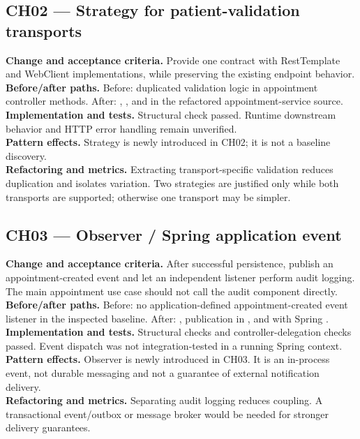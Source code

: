 \documentclass[11pt,a4paper]{article}
\begin{document}
\subsection{CH02 — Strategy for patient-validation transports}
\textbf{Change and acceptance criteria.} Provide one  contract with RestTemplate and WebClient implementations, while preserving the existing endpoint behavior.\\
\textbf{Before/after paths.} Before: duplicated validation logic in appointment controller methods. After: , , and  in the refactored appointment-service source.\\
\textbf{Implementation and tests.} Structural check  passed. Runtime downstream behavior and HTTP error handling remain unverified.\\
\textbf{Pattern effects.} Strategy is newly introduced in CH02; it is not a baseline discovery.\\
\textbf{Refactoring and metrics.} Extracting transport-specific validation reduces duplication and isolates variation. Two strategies are justified only while both transports are supported; otherwise one transport may be simpler.

\subsection{CH03 — Observer / Spring application event}
\textbf{Change and acceptance criteria.} After successful persistence, publish an appointment-created event and let an independent listener perform audit logging. The main appointment use case should not call the audit component directly.\\
\textbf{Before/after paths.} Before: no application-defined appointment-created event listener in the inspected baseline. After: , publication in , and  with Spring .\\
\textbf{Implementation and tests.} Structural checks  and controller-delegation checks passed. Event dispatch was not integration-tested in a running Spring context.\\
\textbf{Pattern effects.} Observer is newly introduced in CH03. It is an in-process event, not durable messaging and not a guarantee of external notification delivery.\\
\textbf{Refactoring and metrics.} Separating audit logging reduces coupling. A transactional event/outbox or message broker would be needed for stronger delivery guarantees.
\end{document}
